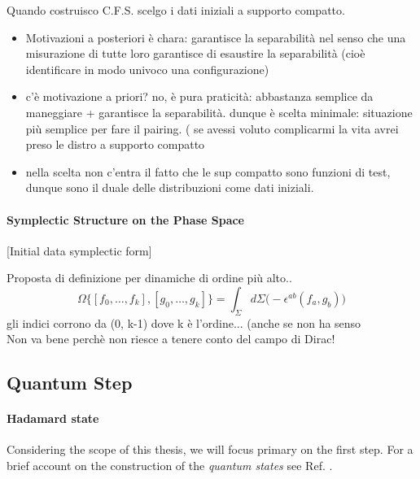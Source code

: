 \documentclass[Main]{subfiles}
\begin{document}
\begin{Warning}
		Quando costruisco C.F.S. scelgo i dati iniziali a supporto compatto.
			\begin{itemize}
				\item Motivazioni a posteriori è chara: garantisce la separabilità nel senso che una misurazione di tutte loro garantisce di esaustire la separabilità (cioè identificare in modo univoco una configurazione)
				\item c'è motivazione a priori? no, è pura praticità: abbastanza semplice da maneggiare + garantisce la separabilità. dunque è scelta minimale: situazione più semplice per fare il pairing. ( se avessi voluto complicarmi la vita avrei preso le distro a supporto compatto
				\item nella scelta non c'entra il fatto che le sup compatto sono funzioni di test, dunque sono il duale delle distribuzioni come dati iniziali.
			\end{itemize}
		\end{Warning}
				\paragraph{Symplectic Structure on the Phase Space}
				[Initial data symplectic form]			
			\begin{Warning}
				Proposta di definizione per dinamiche di ordine più alto..
				\begin{displaymath}
					\Omega \biggr\{ [f_0,\ldots, f_k] , [g_0,\ldots, g_k] \biggr\} =
					\int_\Sigma d\Sigma  \biggr(-\epsilon^{ab}(f_a,g_b) \biggr)
				\end{displaymath}
				gli indici corrono da (0, k-1) dove k è l'ordine... (anche se non ha senso \\
				Non va bene perchè non riesce a tenere conto del campo di Dirac!
			\end{Warning}
	\subsection{Quantum Step}
	   		\paragraph{Hadamard state} 
			Considering the scope of this thesis, we will focus primary on the first step. For a brief account on the construction of the \emph{quantum states} see Ref. \cite{Benini2013}.
\end{document}
